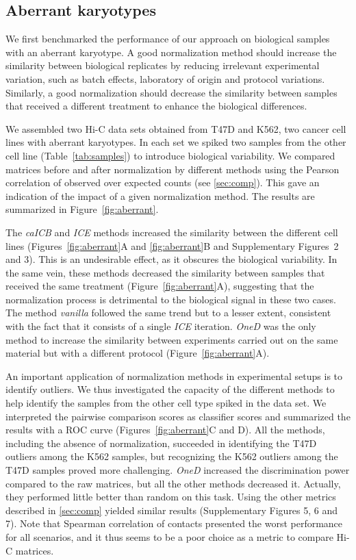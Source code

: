 \documentclass{bioinfo}
\begin{document}
\subsection{Aberrant karyotypes}

We first benchmarked the performance of our approach on biological
samples with an aberrant karyotype. A good normalization method should
increase the similarity between biological replicates by reducing
irrelevant experimental variation, such as batch effects, laboratory of
origin and protocol variations. Similarly, a good normalization should
decrease the similarity between samples that received a different
treatment to enhance the biological differences.

We assembled two Hi-C data sets obtained from T47D and K562, two cancer
cell lines with aberrant karyotypes. In each set we spiked two samples
from the other cell line (Table~\ref{tab:samples}) to
introduce biological variability. We compared matrices before and after
normalization by different methods using the Pearson correlation of
observed over expected counts (see \ref{sec:comp}). This gave an
indication of the impact of a given normalization method. The results are
summarized in Figure~\ref{fig:aberrant}.

The \textit{caICB} and \textit{ICE} methods increased the similarity
between the different cell lines (Figures~\ref{fig:aberrant}A and
\ref{fig:aberrant}B and Supplementary Figures~2 and 3). This is an
undesirable effect, as it obscures the biological variability. In the same
vein, these methods decreased the similarity between samples that received
the same treatment (Figure~\ref{fig:aberrant}A), suggesting that the
normalization process is detrimental to the biological signal in these two
cases. The method \textit{vanilla} followed the same trend but to a lesser
extent, consistent with the fact that it consists of a single \textit{ICE}
iteration. \textit{OneD} was the only method to increase the similarity
between experiments carried out on the same material but with a different
protocol (Figure~\ref{fig:aberrant}A).

An important application of normalization methods in experimental setups
is to identify outliers. We thus investigated the capacity of the
different methods to help identify the samples from the other cell type
spiked in the data set. We interpreted the pairwise comparison scores as
classifier scores and summarized the results with a ROC curve
(Figures~\ref{fig:aberrant}C and D). All the methods, including the
absence of normalization, succeeded in identifying the T47D outliers among
the K562 samples, but recognizing the K562 outliers among the T47D samples
proved more challenging. \textit{OneD} increased the discrimination power
compared to the raw matrices, but all the other methods decreased it.
Actually, they performed little better than random on this task. Using the
other metrics described in \ref{sec:comp} yielded similar results
(Supplementary Figures 5, 6 and 7). Note that Spearman correlation of
contacts presented the worst performance for all scenarios, and it thus
seems to be a poor choice as a metric to compare Hi-C matrices.
\end{document}
